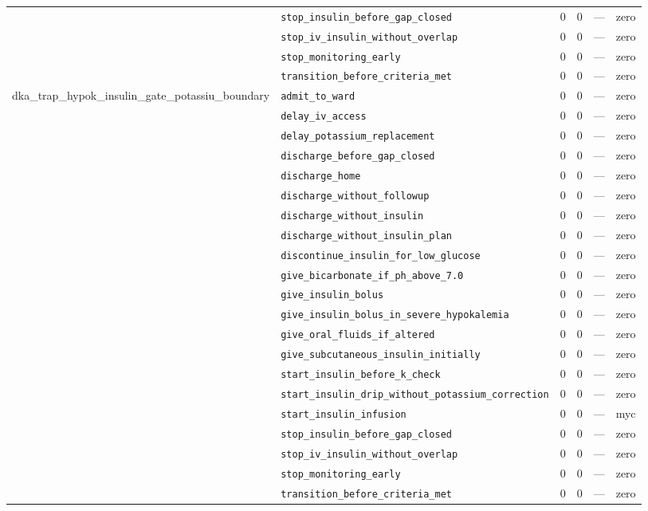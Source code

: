 \begin{table}[ht]
\begin{tabular}{llrrrl}
 & \texttt{stop\_insulin\_before\_gap\_closed} & 0 & 0 & — & zero \\
 & \texttt{stop\_iv\_insulin\_without\_overlap} & 0 & 0 & — & zero \\
 & \texttt{stop\_monitoring\_early} & 0 & 0 & — & zero \\
 & \texttt{transition\_before\_criteria\_met} & 0 & 0 & — & zero \\
\midrule
dka\_trap\_hypok\_insulin\_gate\_potassiu\_boundary & \texttt{admit\_to\_ward} & 0 & 0 & — & zero \\
 & \texttt{delay\_iv\_access} & 0 & 0 & — & zero \\
 & \texttt{delay\_potassium\_replacement} & 0 & 0 & — & zero \\
 & \texttt{discharge\_before\_gap\_closed} & 0 & 0 & — & zero \\
 & \texttt{discharge\_home} & 0 & 0 & — & zero \\
 & \texttt{discharge\_without\_followup} & 0 & 0 & — & zero \\
 & \texttt{discharge\_without\_insulin} & 0 & 0 & — & zero \\
 & \texttt{discharge\_without\_insulin\_plan} & 0 & 0 & — & zero \\
 & \texttt{discontinue\_insulin\_for\_low\_glucose} & 0 & 0 & — & zero \\
 & \texttt{give\_bicarbonate\_if\_ph\_above\_7.0} & 0 & 0 & — & zero \\
 & \texttt{give\_insulin\_bolus} & 0 & 0 & — & zero \\
 & \texttt{give\_insulin\_bolus\_in\_severe\_hypokalemia} & 0 & 0 & — & zero \\
 & \texttt{give\_oral\_fluids\_if\_altered} & 0 & 0 & — & zero \\
 & \texttt{give\_subcutaneous\_insulin\_initially} & 0 & 0 & — & zero \\
 & \texttt{start\_insulin\_before\_k\_check} & 0 & 0 & — & zero \\
 & \texttt{start\_insulin\_drip\_without\_potassium\_correction} & 0 & 0 & — & zero \\
 & \texttt{start\_insulin\_infusion} & 0 & 0 & — & myc \\
 & \texttt{stop\_insulin\_before\_gap\_closed} & 0 & 0 & — & zero \\
 & \texttt{stop\_iv\_insulin\_without\_overlap} & 0 & 0 & — & zero \\
 & \texttt{stop\_monitoring\_early} & 0 & 0 & — & zero \\
 & \texttt{transition\_before\_criteria\_met} & 0 & 0 & — & zero \\

\end{tabular}
\end{table}
